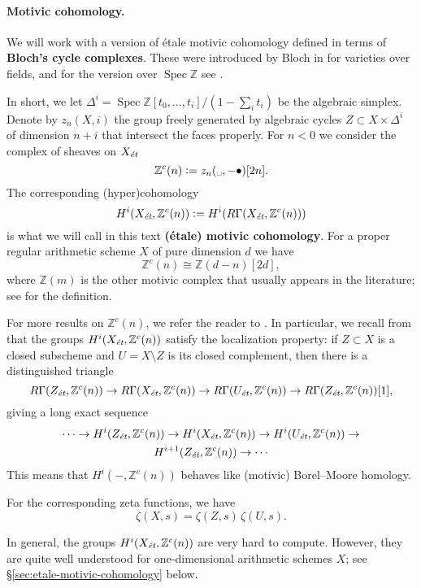 \documentclass[draft]{article}
\DeclareMathOperator{\Spec}{Spec}
\newcommand{\ZZ}{\mathbb{Z}}
\newcommand{\et}{\text{\it \'{e}t}}
\newcommand{\dfn}{\mathrel{\mathop:}=}
\theoremstyle{myplain}
\theoremstyle{mydefinition}
\begin{document}
\paragraph{Motivic cohomology.}
We will work with a version of \'{e}tale motivic cohomology defined in terms of
\textbf{Bloch's cycle complexes}. These were introduced by Bloch in
\cite{Bloch-1986} for varieties over fields, and for the version over
$\Spec \ZZ$ see \cite{Geisser-2004-Dedekind,Geisser-2005}.

In short, we let $\Delta^i = \Spec \ZZ [t_0,\ldots,t_i] / (1 - \sum_i t_i)$ be
the algebraic simplex. Denote by $z_n (X, i)$ the group freely generated by
algebraic cycles $Z \subset X \times \Delta^i$ of dimension $n+i$ that intersect
the faces properly. For $n < 0$ we consider the complex of sheaves on $X_\et$
$$\ZZ^c (n) \dfn z_n (\text{\textvisiblespace}, -\bullet) [2n].$$
The corresponding (hyper)cohomology
$$H^i (X_\et, \ZZ^c (n)) \dfn H^i (R\Gamma (X_\et, \ZZ^c (n)))$$
is what we will call in this text \textbf{(\'{e}tale) motivic cohomology}.
For a proper regular arithmetic scheme $X$ of pure dimension $d$ we have
\begin{equation}
  \label{eqn:Zc(n)-vs-Z(d-n)}
  \ZZ^c (n) \cong \ZZ (d-n) [2d],
\end{equation}
where $\ZZ (m)$ is the other motivic complex that usually appears in the
literature; see \cite{Geisser-2004-Dedekind,Geisser-2005} for the definition.

For more results on $\ZZ^c (n)$, we refer the reader to \cite{Geisser-2010}. In
particular, we recall from \cite[Corollary~7.2]{Geisser-2010} that the groups
$H^i (X_\et, \ZZ^c (n))$ satisfy the localization property: if $Z \subset X$ is a
closed subscheme and $U = X\setminus Z$ is its closed complement, then there is
a distinguished triangle
\[ R\Gamma (Z_\et, \ZZ^c (n)) \to
  R\Gamma (X_\et, \ZZ^c (n)) \to
  R\Gamma (U_\et, \ZZ^c (n)) \to 
  R\Gamma (Z_\et, \ZZ^c (n)) [1], \]
giving a long exact sequence
\begin{multline}
  \label{eqn:localization-les}
  \cdots \to H^i (Z_\et, \ZZ^c (n)) \to
  H^i (X_\et, \ZZ^c (n)) \to
  H^i (U_\et, \ZZ^c (n)) \to \\
  H^{i+1} (Z_\et, \ZZ^c (n)) \to \cdots
\end{multline}
This means that $H^i (-, \ZZ^c (n))$ behaves like (motivic) Borel--Moore
homology.

For the corresponding zeta functions, we have
$$\zeta (X,s) = \zeta (Z,s)\,\zeta (U,s).$$

In general, the groups $H^i (X_\et, \ZZ^c (n))$ are very hard to
compute. However, they are quite well understood for one-dimensional arithmetic
schemes $X$; see \S\ref{sec:etale-motivic-cohomology} below.
\end{document}

